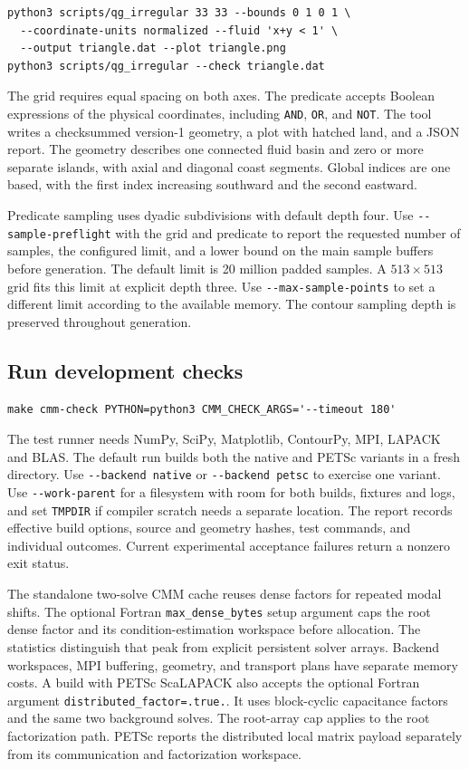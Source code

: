 \documentclass[a4paper]{book}
\begin{document}
\begin{verbatim}
python3 scripts/qg_irregular 33 33 --bounds 0 1 0 1 \
  --coordinate-units normalized --fluid 'x+y < 1' \
  --output triangle.dat --plot triangle.png
python3 scripts/qg_irregular --check triangle.dat
\end{verbatim}

The grid requires equal spacing on both axes. The predicate accepts Boolean
expressions of the physical coordinates, including \verb|AND|, \verb|OR|,
and \verb|NOT|. The tool writes a checksummed version-1 geometry, a plot
with hatched land, and a JSON report. The geometry describes one connected
fluid basin and zero or more separate islands, with axial and diagonal
coast segments. Global indices are one based, with the first index
increasing southward and the second eastward.

Predicate sampling uses dyadic subdivisions with default depth four. Use
\verb|--sample-preflight| with the grid and predicate to report the requested
number of samples, the configured limit, and a lower bound on the main
sample buffers before generation. The default limit is 20 million padded
samples. A $513\times513$ grid fits this limit at explicit depth three.
Use \verb|--max-sample-points| to set a different limit according to the
available memory. The contour sampling depth is preserved throughout
generation.

\subsection{Run development checks}

\begin{verbatim}
make cmm-check PYTHON=python3 CMM_CHECK_ARGS='--timeout 180'
\end{verbatim}

The test runner needs NumPy, SciPy, Matplotlib, ContourPy, MPI, LAPACK and
BLAS. The default run builds both the native and PETSc variants in a fresh
directory. Use \verb|--backend native| or \verb|--backend petsc| to exercise
one variant. Use \verb|--work-parent| for a filesystem with room for both
builds, fixtures and logs, and set \verb|TMPDIR| if compiler scratch needs a
separate location. The report records effective build options, source and
geometry hashes, test commands, and individual outcomes. Current
experimental acceptance failures return a nonzero exit status.

The standalone two-solve CMM cache reuses dense factors for repeated modal
shifts. The optional Fortran \verb|max_dense_bytes| setup argument caps the
root dense factor and its condition-estimation workspace before allocation.
The statistics distinguish that peak from explicit persistent solver arrays.
Backend workspaces, MPI buffering, geometry, and transport plans have
separate memory costs. A build with PETSc ScaLAPACK also accepts the
optional Fortran argument \verb|distributed_factor=.true.|. It uses
block-cyclic capacitance factors and the same two background solves.
The root-array cap applies to the root factorization path. PETSc reports
the distributed local matrix payload separately from its communication
and factorization workspace.
\end{document}
